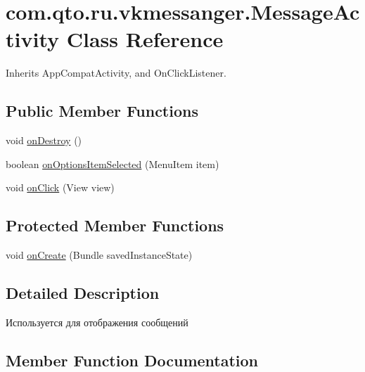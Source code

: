 \hypertarget{classcom_1_1qto_1_1ru_1_1vkmessanger_1_1_message_activity}{}\section{com.\+qto.\+ru.\+vkmessanger.\+Message\+Activity Class Reference}
\label{classcom_1_1qto_1_1ru_1_1vkmessanger_1_1_message_activity}


Inherits App\+Compat\+Activity, and On\+Click\+Listener.

\subsection*{Public Member Functions}
\begin{DoxyCompactItemize}
\item 
void \hyperlink{classcom_1_1qto_1_1ru_1_1vkmessanger_1_1_message_activity_aa077b5a88d0b59f84dbb8021c2c43db5}{on\+Destroy} ()
\item 
boolean \hyperlink{classcom_1_1qto_1_1ru_1_1vkmessanger_1_1_message_activity_ad5de7b840e8c9b309200789dd1e43a62}{on\+Options\+Item\+Selected} (Menu\+Item item)
\item 
void \hyperlink{classcom_1_1qto_1_1ru_1_1vkmessanger_1_1_message_activity_af0315f631a2297c826ee2eee54fe35fa}{on\+Click} (View view)
\end{DoxyCompactItemize}
\subsection*{Protected Member Functions}
\begin{DoxyCompactItemize}
\item 
void \hyperlink{classcom_1_1qto_1_1ru_1_1vkmessanger_1_1_message_activity_ad71e8c9da68aa14984194f427e08e77c}{on\+Create} (Bundle saved\+Instance\+State)
\end{DoxyCompactItemize}


\subsection{Detailed Description}
Используется для отображения сообщений 

\subsection{Member Function Documentation}
\hypertarget{classcom_1_1qto_1_1ru_1_1vkmessanger_1_1_message_activity_af0315f631a2297c826ee2eee54fe35fa}{}
